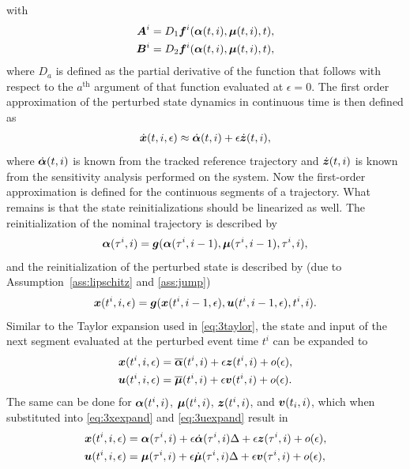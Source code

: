 \documentclass[../DC2017114Bouma.tex]{subfiles}
\begin{document}
with
\begin{align}
{\boldsymbol{A}}^i &= D_1{\boldsymbol{f}}^i(\boldsymbol{\alpha}(t,i),\boldsymbol{\mu}(t,i),t),\\
{\boldsymbol{B}}^i &= D_2{\boldsymbol{f}}^i(\boldsymbol{\alpha}(t,i),\boldsymbol{\mu}(t,i),t),
\end{align}
where $D_a$ is defined as the partial derivative of the function that follows with respect to the $a^{\text{th}}$ argument of that function evaluated at $\epsilon = 0$. The first order approximation of the perturbed state dynamics in continuous time is then defined as
\begin{align}
\dot{{\boldsymbol{x}}}(t,i,\epsilon) \approx \dot{\boldsymbol{\alpha}}(t,i) + \epsilon\dot{{\boldsymbol{z}}}(t,i),
\end{align}
where $\dot{\boldsymbol{\alpha}}(t,i)$ is known from the tracked reference trajectory and $\dot{{\boldsymbol{z}}}(t,i)$ is known from the sensitivity analysis performed on the system. Now the first-order approximation is defined for the continuous segments of a trajectory. What remains is that the state reinitializations should be linearized as well. The reinitialization of the nominal trajectory is described by
\begin{align}
\boldsymbol{\alpha}(\tau^i,i) = {\boldsymbol{g}}(\boldsymbol{\alpha}(\tau^i,i-1),\boldsymbol{\mu}(\tau^i,i-1),\tau^i,i),\label{eq:3g}
\end{align}
and the reinitialization of the perturbed state is described by (due to Assumption~\ref{ass:lipschitz} and \ref{ass:jump})
\begin{align}
{\boldsymbol{x}}(t^{i},i,\epsilon) = {\boldsymbol{g}}({\boldsymbol{x}}(t^{i},i-1,\epsilon),{\boldsymbol{u}}(t^{i},i-1,\epsilon),t^{i},i).
\end{align}
Similar to the Taylor expansion used in \eqref{eq:3taylor}, the state and input of the next segment evaluated at the perturbed event time $t^{i}$ can be expanded to
\begin{align}
{\boldsymbol{x}}(t^{i},i,\epsilon) &= \overline{\boldsymbol{\alpha}}(t^{i},i) + \epsilon{\boldsymbol{z}}(t^{i},i) + o(\epsilon),\label{eq:3xexpand}\\
{\boldsymbol{u}}(t^{i},i,\epsilon) &= \overline{\boldsymbol{\mu}}(t^{i},i) + \epsilon{\boldsymbol{v}}(t^{i},i) + o(\epsilon).\label{eq:3uexpand}
\end{align}
The same can be done for $\boldsymbol{\alpha}(t^{i},i)$, $\boldsymbol{\mu}(t^{i},i)$, ${\boldsymbol{z}}(t^{i},i)$, and ${\boldsymbol{v}}(t_{i},i)$, which when substituted into \eqref{eq:3xexpand} and \eqref{eq:3uexpand} result in
\begin{align}
{\boldsymbol{x}}(t^{i},i,\epsilon) &= \boldsymbol{\alpha}(\tau^i,i) + \epsilon\dot{\boldsymbol{\alpha}}(\tau^i,i)\Delta + \epsilon{\boldsymbol{z}}(\tau^i,i) + o(\epsilon),\label{eq:3xexpand2}\\
{\boldsymbol{u}}(t^{i},i,\epsilon) &= \boldsymbol{\mu}(\tau^i,i) + \epsilon\dot{\boldsymbol{\mu}}(\tau^i,i)\Delta + \epsilon{\boldsymbol{v}}(\tau^i,i) + o(\epsilon),\label{eq:3uexpand2}
\end{align}
\end{document}
